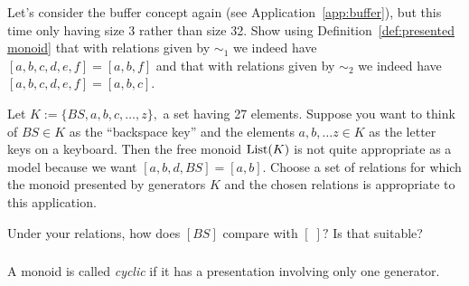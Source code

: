 \documentclass[CT4S-EN-RU]{subfiles}
\begin{document}
\begin{applicationRUS}[Buffer]\label{app:buffer}
\end{applicationRUS}

\begin{exerciseENG}\label{exc:buffer3}
Let's consider the buffer concept again (see Application~\ref{app:buffer}), but this time only having size 3 rather than size 32. Show using Definition~\ref{def:presented monoid} that with relations given by $\sim_1$ we indeed have $[a,b,c,d,e,f]=[a,b,f]$ and that with relations given by $\sim_2$ we indeed have $[a,b,c,d,e,f]=[a,b,c].$
\end{exerciseENG}

\begin{exerciseRUS}\label{exc:buffer3}
\end{exerciseRUS}

\begin{exerciseENG}
Let $K:=\{BS,a,b,c,\ldots,z\},$ a set having 27 elements. Suppose you want to think of $BS\in K$ as the “backspace key” and the elements $a,b,\ldots z\in K$ as the letter keys on a keyboard. Then the free monoid $\textnormal{List}(K)$ is not quite appropriate as a model because we want $[a,b,d,BS]=[a,b].$
\sexc Choose a set of relations for which the monoid presented by generators $K$ and the chosen relations is appropriate to this application.
\item Under your relations, how does $[BS]$ compare with $[\;]?$ Is that suitable?
\endsexc
\end{exerciseENG}

\begin{exerciseRUS}
\end{exerciseRUS}


\subsubsection{}

\begin{definitionENG}
A monoid is called {\em cyclic} if it has a presentation involving only one generator.
\end{definitionENG}

\begin{definitionRUS}
\end{definitionRUS}
\end{document}
